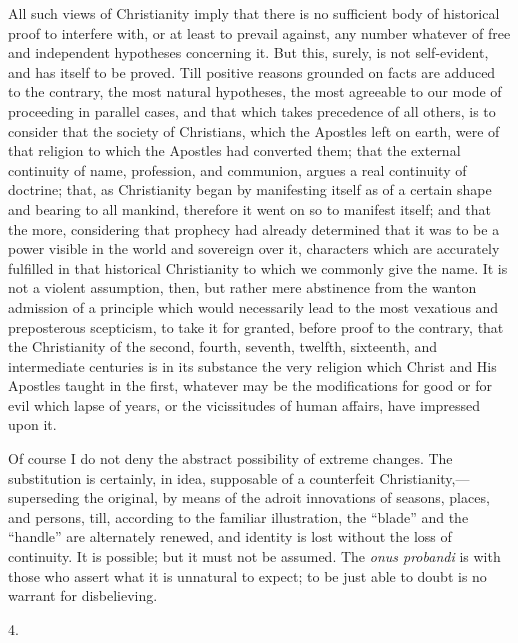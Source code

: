 All such views of Christianity imply that there is no
sufficient body of historical proof to interfere with, or
at least to prevail against, any number whatever of free
and independent hypotheses concerning it. But this,
surely, is not self-evident, and has itself to be proved.
Till positive reasons grounded on facts are adduced to
the contrary, the most natural hypotheses, the most
agreeable to our mode of proceeding in parallel cases,
and that which takes precedence of all others, is to
consider that the society of Christians, which the
Apostles left on earth, were of that religion to which
the Apostles had converted them; that the external
continuity of name, profession, and communion, argues a
real continuity of doctrine; that, as Christianity began
by manifesting itself as of a certain shape and bearing
to all mankind, therefore it went on so to manifest
itself; and that the more, considering that prophecy had
already determined that it was to be a power visible in
the world and sovereign over it, characters which are
accurately fulfilled in that historical Christianity to
which we commonly give the name. It is not a violent
assumption, then, but rather mere abstinence from the
wanton admission of a principle which would necessarily
lead to the most vexatious and preposterous scepticism,
to take it for granted, before proof to the contrary,
that the Christianity of the second, fourth, seventh,
twelfth, sixteenth, and intermediate centuries is in its
substance the very religion which Christ and His Apostles
taught in the first, whatever may be the modifications
for good or for evil which lapse of years, or the
vicissitudes of human affairs, have impressed upon it.

Of course I do not deny the abstract possibility of
extreme changes. The substitution is certainly, in idea,
supposable of a counterfeit
Christianity,—superseding the original, by means of
the adroit innovations of seasons, places, and persons,
till, according to the familiar illustration, the
``blade'' and the ``handle'' are
alternately renewed, and identity is lost without the
loss of continuity. It is possible; but it must not be
assumed. The \emph{onus probandi} is with those who
assert what it is unnatural to expect; to be just able to
doubt is no warrant for disbelieving.

4.

